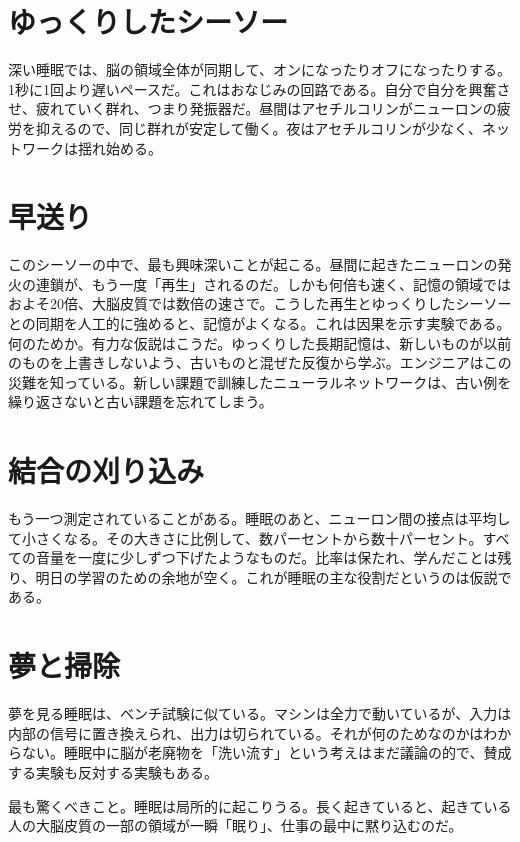 \section*{ゆっくりしたシーソー}

深い睡眠では、脳の領域全体が同期して、オンになったりオフになったりする。1秒に1回より遅いペースだ。これはおなじみの回路である。自分で自分を興奮させ、疲れていく群れ、つまり発振器だ。昼間はアセチルコリンがニューロンの疲労を抑えるので、同じ群れが安定して働く。夜はアセチルコリンが少なく、ネットワークは揺れ始める。


\section*{早送り}

このシーソーの中で、最も興味深いことが起こる。昼間に起きたニューロンの発火の連鎖が、もう一度「再生」されるのだ。しかも何倍も速く、記憶の領域ではおよそ20倍、大脳皮質では数倍の速さで。こうした再生とゆっくりしたシーソーとの同期を人工的に強めると、記憶がよくなる。これは因果を示す実験である。何のためか。有力な仮説はこうだ。ゆっくりした長期記憶は、新しいものが以前のものを上書きしないよう、古いものと混ぜた反復から学ぶ。エンジニアはこの災難を知っている。新しい課題で訓練したニューラルネットワークは、古い例を繰り返さないと古い課題を忘れてしまう。

\section*{結合の刈り込み}

もう一つ測定されていることがある。睡眠のあと、ニューロン間の接点は平均して小さくなる。その大きさに比例して、数パーセントから数十パーセント。すべての音量を一度に少しずつ下げたようなものだ。比率は保たれ、学んだことは残り、明日の学習のための余地が空く。これが睡眠の主な役割だというのは仮説である。

\section*{夢と掃除}

夢を見る睡眠は、ベンチ試験に似ている。マシンは全力で動いているが、入力は内部の信号に置き換えられ、出力は切られている。それが何のためなのかはわからない。睡眠中に脳が老廃物を「洗い流す」という考えはまだ議論の的で、賛成する実験も反対する実験もある。

最も驚くべきこと。睡眠は局所的に起こりうる。長く起きていると、起きている人の大脳皮質の一部の領域が一瞬「眠り」、仕事の最中に黙り込むのだ。

